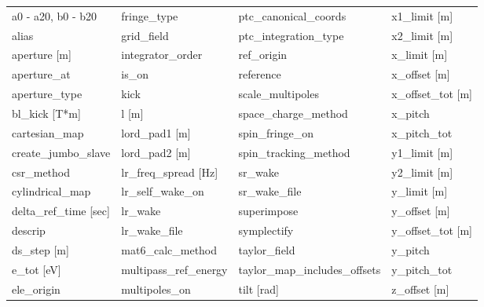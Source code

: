  \begin{tabular}{llll} \toprule
a0 - a20, b0 - b20             & fringe_type                    & ptc_canonical_coords           & x1_limit [m]                   \\
alias                          & grid_field                     & ptc_integration_type           & x2_limit [m]                   \\
aperture [m]                   & integrator_order               & ref_origin                     & x_limit [m]                    \\
aperture_at                    & is_on                          & reference                      & x_offset [m]                   \\
aperture_type                  & kick                           & scale_multipoles               & x_offset_tot [m]               \\
bl_kick [T*m]                  & l [m]                          & space_charge_method            & x_pitch                        \\
cartesian_map                  & lord_pad1 [m]                  & spin_fringe_on                 & x_pitch_tot                    \\
create_jumbo_slave             & lord_pad2 [m]                  & spin_tracking_method           & y1_limit [m]                   \\
csr_method                     & lr_freq_spread [Hz]            & sr_wake                        & y2_limit [m]                   \\
cylindrical_map                & lr_self_wake_on                & sr_wake_file                   & y_limit [m]                    \\
delta_ref_time [sec]           & lr_wake                        & superimpose                    & y_offset [m]                   \\
descrip                        & lr_wake_file                   & symplectify                    & y_offset_tot [m]               \\
ds_step [m]                    & mat6_calc_method               & taylor_field                   & y_pitch                        \\
e_tot [eV]                     & multipass_ref_energy           & taylor_map_includes_offsets    & y_pitch_tot                    \\
ele_origin                     & multipoles_on                  & tilt [rad]                     & z_offset [m]                   \\

\end{tabular}
